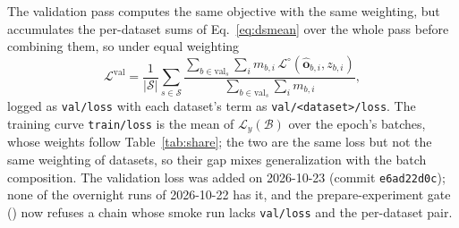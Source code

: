 The validation pass computes the same objective with the same weighting, but accumulates the
per-dataset sums of Eq.~\ref{eq:dsmean} over the whole pass before combining them, so under
equal weighting
\begin{equation}
\mathcal{L}^{\mathrm{val}} = \frac{1}{|\mathcal{S}|} \sum_{s \in \mathcal{S}} \frac{\sum_{b \in \mathrm{val}_s} \sum_i m_{b,i}\, \mathcal{L}^{\circ}(\hat{\mathbf{o}}_{b,i}, z_{b,i})}{\sum_{b \in \mathrm{val}_s} \sum_i m_{b,i}},
\label{eq:valloss}
\end{equation}
logged as \texttt{val/loss} with each dataset's term as \texttt{val/<dataset>/loss}. The
training curve \texttt{train/loss} is the mean of $\mathcal{L}_y(\mathcal{B})$ over the
epoch's batches, whose weights follow Table~\ref{tab:share}; the two are the same loss but
not the same weighting of datasets, so their gap mixes generalization with the batch
composition. The validation loss was added on 2026-10-23 (commit \texttt{e6ad22d0c}); none
of the overnight runs of 2026-10-22 has it, and the prepare-experiment gate
() now refuses a chain whose smoke run
lacks \texttt{val/loss} and the per-dataset pair.
